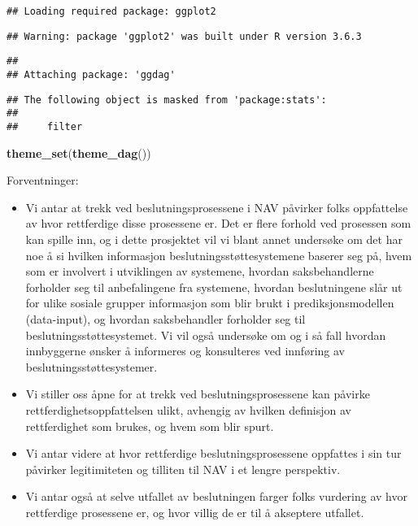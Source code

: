 \documentclass[
]{book}
\newenvironment{Shaded}{\begin{snugshade}}{\end{snugshade}}
\newcommand{\KeywordTok}[1]{\textcolor[rgb]{0.13,0.29,0.53}{\textbf{#1}}}
\newcommand{\NormalTok}[1]{#1}
\begin{document}
\begin{verbatim}
## Loading required package: ggplot2
\end{verbatim}

\begin{verbatim}
## Warning: package 'ggplot2' was built under R version 3.6.3
\end{verbatim}

\begin{verbatim}
## 
## Attaching package: 'ggdag'
\end{verbatim}

\begin{verbatim}
## The following object is masked from 'package:stats':
## 
##     filter
\end{verbatim}

\begin{Shaded}
\begin{Highlighting}[]
\KeywordTok{theme_set}\NormalTok{(}\KeywordTok{theme_dag}\NormalTok{())}
\end{Highlighting}
\end{Shaded}

Forventninger:

\begin{itemize}
\item
  Vi antar at trekk ved beslutningsprosessene i NAV påvirker folks oppfattelse av hvor rettferdige disse prosessene er. Det er flere forhold ved prosessen som kan spille inn, og i dette prosjektet vil vi blant annet undersøke om det har noe å si hvilken informasjon beslutningsstøttesystemene baserer seg på, hvem som er involvert i utviklingen av systemene, hvordan saksbehandlerne forholder seg til anbefalingene fra systemene, hvordan beslutningene slår ut for ulike sosiale grupper informasjon som blir brukt i prediksjonsmodellen (data-input), og hvordan saksbehandler forholder seg til beslutningsstøttesystemet. Vi vil også undersøke om og i så fall hvordan innbyggerne ønsker å informeres og konsulteres ved innføring av beslutningsstøttesystemer.
\item
  Vi stiller oss åpne for at trekk ved beslutningsprosessene kan påvirke rettferdighetsoppfattelsen ulikt, avhengig av hvilken definisjon av rettferdighet som brukes, og hvem som blir spurt.
\item
  Vi antar videre at hvor rettferdige beslutningsprosessene oppfattes i sin tur påvirker legitimiteten og tilliten til NAV i et lengre perspektiv.
\item
  Vi antar også at selve utfallet av beslutningen farger folks vurdering av hvor rettferdige prosessene er, og hvor villig de er til å akseptere utfallet.
\end{itemize}
\end{document}

